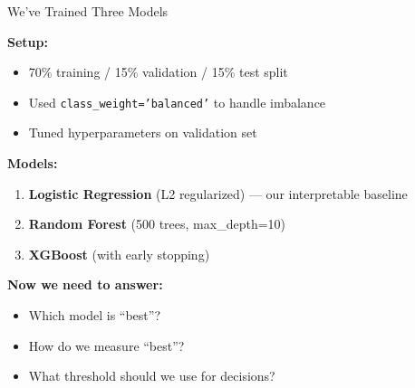 \documentclass[10pt]{beamer}
\begin{document}
\begin{frame}{We've Trained Three Models}

  \textbf{Setup:}
  \begin{itemize}
    \item 70\% training / 15\% validation / 15\% test split
    \item Used \texttt{class\_weight='balanced'} to handle imbalance
    \item Tuned hyperparameters on validation set
  \end{itemize}

  \vspace{1em}
  \textbf{Models:}
  \begin{enumerate}
    \item \textbf{Logistic Regression} (L2 regularized) --- our interpretable baseline
    \item \textbf{Random Forest} (500 trees, max\_depth=10)
    \item \textbf{XGBoost} (with early stopping)
  \end{enumerate}

  \vspace{1em}
  \textbf{Now we need to answer:}
  \begin{itemize}
    \item Which model is ``best''?
    \item How do we measure ``best''?
    \item What threshold should we use for decisions?
  \end{itemize}
\end{frame}

\end{document}
